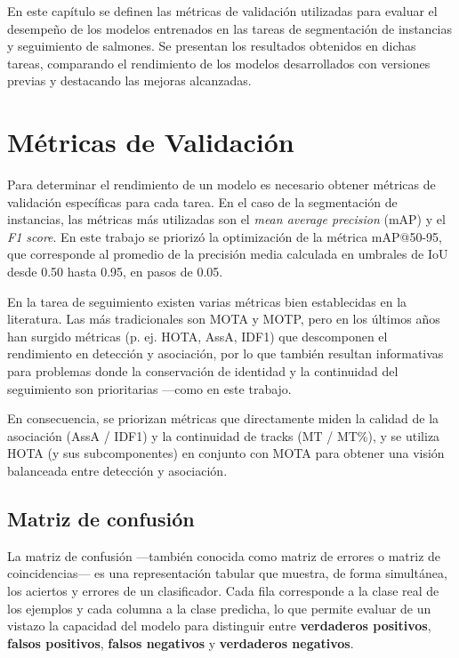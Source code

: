 \label{part:chap4_validacion}
En este capítulo se definen las métricas de validación utilizadas para evaluar el desempeño de los modelos entrenados en las tareas de segmentación de instancias y seguimiento de salmones. Se presentan los resultados obtenidos en dichas tareas, comparando el rendimiento de los modelos desarrollados con versiones previas y destacando las mejoras alcanzadas.

\section{Métricas de Validación}
Para determinar el rendimiento de un modelo es necesario obtener métricas de validación específicas para cada tarea. En el caso de la segmentación de instancias, las métricas más utilizadas son el \textit{mean average precision} (mAP) y el \textit{F1 score}. En este trabajo se priorizó la optimización de la métrica mAP@50-95, que corresponde al promedio de la precisión media calculada en umbrales de IoU desde 0.50 hasta 0.95, en pasos de 0.05.

 En la tarea de seguimiento existen varias métricas bien establecidas en la literatura. Las más tradicionales son MOTA y MOTP, pero en los últimos años han surgido métricas (p. ej. HOTA, AssA, IDF1) que descomponen el rendimiento en detección y asociación, por lo que también resultan informativas para problemas donde la conservación de identidad y la continuidad del seguimiento son prioritarias ---como en este trabajo.

 En consecuencia, se priorizan métricas que directamente miden la calidad de la asociación (AssA / IDF1) y la continuidad de tracks (MT / MT\%), y se utiliza HOTA (y sus subcomponentes) en conjunto con MOTA para obtener una visión balanceada entre detección y asociación.

\subsection{Matriz de confusión}
La matriz de confusión ---también conocida como matriz de errores o matriz de coincidencias--- es una representación tabular que muestra, de forma simultánea, los aciertos y errores de un clasificador. Cada fila corresponde a la clase real de los ejemplos y cada columna a la clase predicha, lo que permite evaluar de un vistazo la capacidad del modelo para distinguir entre \textbf{verdaderos positivos}, \textbf{falsos positivos}, \textbf{falsos negativos} y \textbf{verdaderos negativos}.

